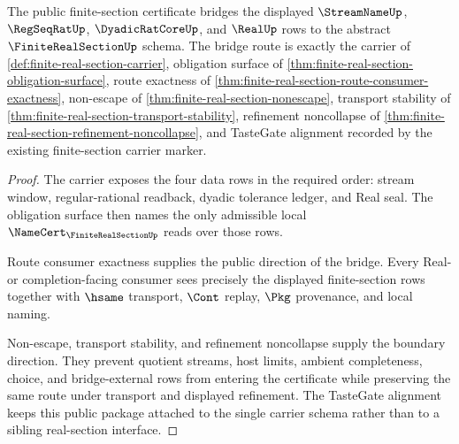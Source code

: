 \begin{theorem}
\label{thm:finite-real-section-public-bridge}
The public finite-section certificate bridges the displayed $\StreamNameUp$, $\RegSeqRatUp$, $\DyadicRatCoreUp$, and $\RealUp$ rows to the abstract $\FiniteRealSectionUp$ schema. The bridge route is exactly the carrier of \autoref{def:finite-real-section-carrier}, obligation surface of \autoref{thm:finite-real-section-obligation-surface}, route exactness of \autoref{thm:finite-real-section-route-consumer-exactness}, non-escape of \autoref{thm:finite-real-section-nonescape}, transport stability of \autoref{thm:finite-real-section-transport-stability}, refinement noncollapse of \autoref{thm:finite-real-section-refinement-noncollapse}, and TasteGate alignment recorded by the existing finite-section carrier marker.
\end{theorem}
\begin{proof}
The carrier exposes the four data rows in the required order: stream window, regular-rational readback, dyadic tolerance ledger, and Real seal. The obligation surface then names the only admissible local $\NameCert_{\FiniteRealSectionUp}$ reads over those rows.

Route consumer exactness supplies the public direction of the bridge. Every Real- or completion-facing consumer sees precisely the displayed finite-section rows together with $\hsame$ transport, $\Cont$ replay, $\Pkg$ provenance, and local naming.

Non-escape, transport stability, and refinement noncollapse supply the boundary direction. They prevent quotient streams, host limits, ambient completeness, choice, and bridge-external rows from entering the certificate while preserving the same route under transport and displayed refinement. The TasteGate alignment keeps this public package attached to the single carrier schema rather than to a sibling real-section interface.
\end{proof}


